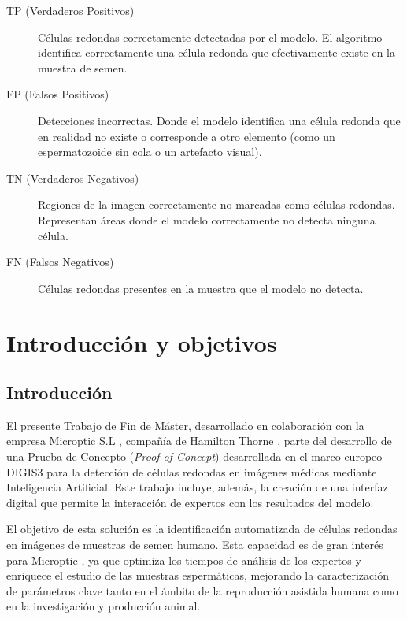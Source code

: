 \documentclass[12pt,a4paper,onecolumn,oneside]{report}
\begin{document}
\begin{description}
  \item[TP (Verdaderos Positivos)] Células redondas correctamente detectadas por el modelo. El algoritmo identifica correctamente una célula redonda que efectivamente existe en la muestra de semen.
  \item[FP (Falsos Positivos)] Detecciones incorrectas. Donde el modelo identifica una célula redonda que en realidad no existe o corresponde a otro elemento (como un espermatozoide sin cola o un artefacto visual).
  \item[TN (Verdaderos Negativos)] Regiones de la imagen correctamente no marcadas como células redondas. Representan áreas donde el modelo correctamente no detecta ninguna célula.
  \item[FN (Falsos Negativos)] Células redondas presentes en la muestra que el modelo no detecta. 
\end{description} 

\newpage
\renewcommand{\thepage}{\arabic{page}}
\setcounter{page}{1} %

\chapter{Introducción y objetivos} %
\label{Introducción y objetivos}
\section{Introducción}
\label{sec:Introducción}

El presente Trabajo de Fin de Máster, desarrollado en colaboración con la empresa Microptic S.L \cite{microptic}, compañía de Hamilton Thorne \cite{HamiltonThorneWeb}, 
parte del desarrollo de una Prueba de Concepto (\textit{Proof of Concept}) desarrollada en el marco europeo DIGIS3 \cite{digis3} para la detección de células redondas en imágenes médicas 
mediante Inteligencia Artificial. Este trabajo incluye, además, la creación de una interfaz digital que permite la interacción de expertos 
con los resultados del modelo.

El objetivo de esta solución es la identificación automatizada de células redondas en imágenes de muestras de semen humano. Esta capacidad es de 
gran interés para Microptic \cite{microptic}, ya que optimiza los tiempos de análisis de los expertos y enriquece el estudio de las muestras espermáticas, 
mejorando la caracterización de parámetros clave tanto en el ámbito de la reproducción asistida humana como en la investigación y producción animal. 
\end{document}
